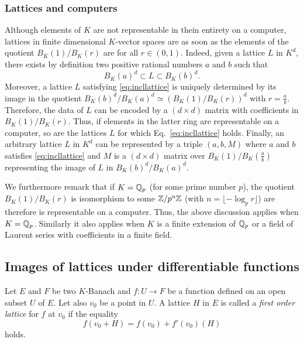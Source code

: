 \documentclass{lms}
\begin{document}
\subsubsection*{Lattices and computers}

Although elements of $K$ are not representable in thein entirety on a 
computer, lattices in finite dimensional $K$-vector spaces are as soon 
as the elements of the quotient $B_K(1)/B_K(r)$ are for all $r \in 
(0,1)$. Indeed, given a lattice $L$ in $K^d$, there exists by definition 
two positive rational numbers $a$ and $b$ such that 
\begin{equation}
\label{eq:incllattice}
B_K(a)^d \subset L \subset B_K(b)^d.
\end{equation}
Moreover, a lattice $L$ satisfying \eqref{eq:incllattice} is uniquely 
determined by its image in the quotient $B_K(b)^d / B_K(a)^d \simeq 
(B_K(1)/B_K(r))^d$ with $r = \frac a b$. Therefore, the data of $L$ can 
be encoded by a $(d \times d)$ matrix with coefficients in $B_K(1)/
B_K(r)$. Thus, if elements in the latter ring are representable on a 
computer, so are the lattices $L$ for which Eq.~\eqref{eq:incllattice} 
holds. Finally, an arbitrary lattice $L$ in $K^d$ can be represented
by a triple $(a,b,M)$ where $a$ and $b$ satisfies \eqref{eq:incllattice}
and $M$ is a $(d \times d)$ matrix over $B_K(1)/B_K(\frac a b)$ 
representing the image of $L$ in $B_K(b)^d / B_K(a)^d$.

We furthermore remark that if $K = \mathbb Q_p$ (for some prime number $p$), 
the quotient $B_K(1)/B_K(r)$ is isomorphism to some $\mathbb Z/p^n\mathbb Z$ (with $n 
= \lfloor - \log_p r \rfloor$) are therefore is representable on a 
computer. Thus, the above discussion applies when $K = \mathbb Q_p$. Similarly 
it also applies when $K$ is a finite extension of $\mathbb Q_p$ or a field of
Laurent series with coefficients in a finite field.

\subsection{Images of lattices under differentiable functions}

\begin{deftn}
\label{def:firstorder}
Let $E$ and $F$ be two $K$-Banach and $f : U \rightarrow F$ be a 
function defined on an open subset $U$ of $E$. Let also $v_0$ be a 
point in $U$.
A lattice $H$ in $E$ is called a \emph{first order lattice} for $f$ at 
$v_0$ if the equality
\begin{equation}
\label{eq:firstorder}
f(v_0 + H) = f(v_0) + f'(v_0) (H)
\end{equation}
holds.
\end{deftn}
\end{document}
